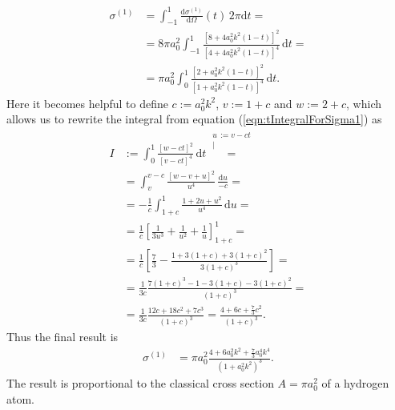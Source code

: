 \documentclass[english, parskip=full]{scrartcl}
\newcommand{\kom}{}
\newcommand{\intx}{}
\newcommand{\klam}{}
\newcommand{\tecxt}{}
\begin{document}
\begin{align}
\sigma^{(1)}&=\intx\int_{-1}^{1}\frac{\tecxt\text{d}\sigma^{(1)}}{\tecxt\text{d}\Omega}(t)\,2\pi\mathrm{d}t=\\
&=8\pi a_0^2\intx\int_{-1}^{1}\frac{\klam\left[ {8+4a_0^2k^2(1-t)} \right]^2}{\klam\left[ {4+4a_0^2k^2(1-t)} \right]^4}\,\mathrm{d}t=\\
&=\pi a_0^2\intx\int_{0}^{1}\frac{\klam\left[ {2+a_0^2k^2(1-t)} \right]^2}{\klam\left[ {1+a_0^2k^2(1-t)} \right]^4}\,\mathrm{d}t.\label{eqn:tIntegralForSigma1}
\end{align}
Here it becomes helpful to define $c:=a_0^2k^2$, $v:=1+c$ and $w:=2+c$, which allows us to rewrite the integral from equation (\ref{eqn:tIntegralForSigma1}) as
\begin{align}
I&:=\intx\int_{0}^{1}\frac{\klam\left[ {w-ct} \right]^2}{\klam\left[ {v-ct} \right]^4}\,\mathrm{d}t\kom\overset{\substack{{u\,:= v-ct} \\ |}}{=}\\
&=\intx\int_{v}^{v-c}\frac{\klam\left[ {w-v+u} \right]^2}{u^4}\,\frac{\mathrm{d}u}{-c}=\\
&=-\frac{1}{c}\intx\int_{1+c}^{1}\frac{1+2u+u^2}{u^4}\,\mathrm{d}u=\\
&=\frac{1}{c}\klam\left[ {\frac{1}{3u^3}+\frac{1}{u^2}+\frac{1}{u}} \right]_{1+c}^{1}=\\
&=\frac{1}{c}\klam\left[ {\frac{7}{3}-\frac{1+3(1+c)+3(1+c)^2}{3(1+c)^3}} \right]=\\
&=\frac{1}{3c}\frac{7(1+c)^3-1-3(1+c)-3(1+c)^2}{(1+c)^3}=\\
&=\frac{1}{3c}\frac{12c+18c^2+7c^3}{(1+c)^3}=\frac{4+6c+\frac{7}{3}c^2}{(1+c)^3}.
\end{align}
Thus the final result is
\begin{align}
\sigma^{(1)}&=\pi a_0^2\frac{4+6a_0^2k^2+\frac{7}{3}a_0^4k^4}{(1+a_0^2k^2)^3}.
\end{align}
The result is proportional to the classical cross section $A=\pi a_0^2$ of a hydrogen atom.
\end{document}

